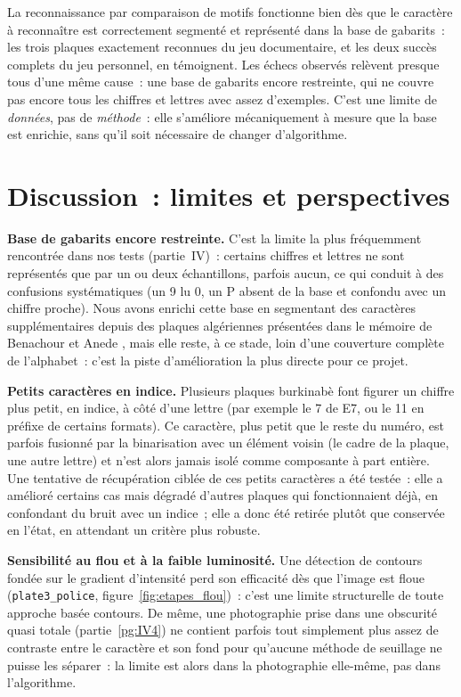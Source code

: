 \documentclass[11pt,a4paper]{article}
\begin{document}
La reconnaissance par comparaison de motifs fonctionne bien dès que le caractère à reconnaître est correctement segmenté et représenté dans la base de gabarits~: les trois plaques exactement reconnues du jeu documentaire, et les deux succès complets du jeu personnel, en témoignent. Les échecs observés relèvent presque tous d'une même cause~: une base de gabarits encore restreinte, qui ne couvre pas encore tous les chiffres et lettres avec assez d'exemples. C'est une limite de \emph{données}, pas de \emph{méthode}~: elle s'améliore mécaniquement à mesure que la base est enrichie, sans qu'il soit nécessaire de changer d'algorithme.

\section{Discussion~: limites et perspectives}
\label{pg:V}

\textbf{Base de gabarits encore restreinte.} C'est la limite la plus fréquemment rencontrée dans nos tests (partie~IV)~: certains chiffres et lettres ne sont représentés que par un ou deux échantillons, parfois aucun, ce qui conduit à des confusions systématiques (un \og{}9\fg{} lu \og{}0\fg{}, un \og{}P\fg{} absent de la base et confondu avec un chiffre proche). Nous avons enrichi cette base en segmentant des caractères supplémentaires depuis des plaques algériennes présentées dans le mémoire de Benachour et Anede \cite{ref_blida}, mais elle reste, à ce stade, loin d'une couverture complète de l'alphabet~: c'est la piste d'amélioration la plus directe pour ce projet.

\textbf{Petits caractères en indice.} Plusieurs plaques burkinabè font figurer un chiffre plus petit, en indice, à côté d'une lettre (par exemple le \og{}7\fg{} de \og{}E7\fg{}, ou le \og{}11\fg{} en préfixe de certains formats). Ce caractère, plus petit que le reste du numéro, est parfois fusionné par la binarisation avec un élément voisin (le cadre de la plaque, une autre lettre) et n'est alors jamais isolé comme composante à part entière. Une tentative de récupération ciblée de ces petits caractères a été testée~: elle a amélioré certains cas mais dégradé d'autres plaques qui fonctionnaient déjà, en confondant du bruit avec un indice~; elle a donc été retirée plutôt que conservée en l'état, en attendant un critère plus robuste.

\textbf{Sensibilité au flou et à la faible luminosité.} Une détection de contours fondée sur le gradient d'intensité perd son efficacité dès que l'image est floue (\texttt{plate3\_police}, figure~\ref{fig:etapes_flou})~: c'est une limite structurelle de toute approche basée contours. De même, une photographie prise dans une obscurité quasi totale (partie~\ref{pg:IV4}) ne contient parfois tout simplement plus assez de contraste entre le caractère et son fond pour qu'aucune méthode de seuillage ne puisse les séparer~: la limite est alors dans la photographie elle-même, pas dans l'algorithme.
\end{document}
